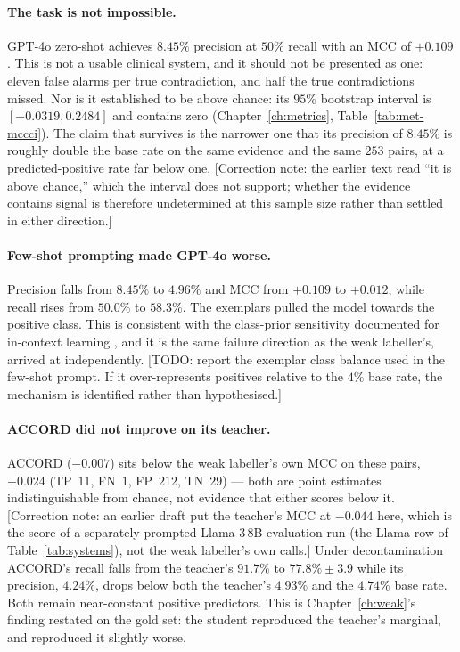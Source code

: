 \paragraph{The task is not impossible.} GPT-4o zero-shot
\citep{openai2023gpt4} achieves $8.45\%$ precision at $50\%$ recall with an MCC
of $+0.109$. This is not a usable clinical system, and it should not be presented
as one: eleven false alarms per true contradiction, and half the true
contradictions missed. Nor is it established to be above chance: its $95\%$
bootstrap interval is $[-0.0319, 0.2484]$ and contains zero
(Chapter~\ref{ch:metrics}, Table~\ref{tab:met-mccci}). The claim that survives is
the narrower one that its precision of $8.45\%$ is roughly double the base rate
on the same evidence and the same $253$ pairs, at a predicted-positive rate far
below one. [Correction note: the earlier text read ``it is above chance,'' which
the interval does not support; whether the evidence contains signal is therefore
undetermined at this sample size rather than settled in either direction.]

\paragraph{Few-shot prompting made GPT-4o worse.} Precision falls from $8.45\%$
to $4.96\%$ and MCC from $+0.109$ to $+0.012$, while recall rises from $50.0\%$
to $58.3\%$. The exemplars pulled the model towards the positive class. This is
consistent with the class-prior sensitivity documented for in-context learning
\citep{zhao2021calibrate}, and it is the same failure direction as the weak
labeller's, arrived at independently. [TODO: report the exemplar class balance
used in the few-shot prompt. If it over-represents positives relative to the
$4\%$ base rate, the mechanism is identified rather than hypothesised.]

\paragraph{ACCORD did not improve on its teacher.} ACCORD ($-0.007$) sits below
the weak labeller's own MCC on these pairs, $+0.024$ (TP~$11$, FN~$1$,
FP~$212$, TN~$29$) --- both are point estimates indistinguishable from chance,
not evidence that either scores below it. [Correction note: an earlier draft
put the teacher's MCC at $-0.044$ here, which is the score of a separately
prompted Llama 3\,8B evaluation run (the Llama row of
Table~\ref{tab:systems}), not the weak labeller's own calls.] Under
decontamination ACCORD's recall falls from the teacher's $91.7\%$ to
$77.8\% \pm 3.9$ while its precision, $4.24\%$, drops below both the teacher's
$4.93\%$ and the $4.74\%$ base rate. Both remain near-constant positive
predictors. This is Chapter~\ref{ch:weak}'s finding restated on the gold set: the
student reproduced the teacher's marginal, and reproduced it slightly worse.

